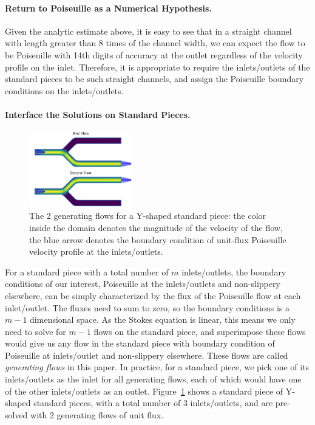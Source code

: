 \documentclass[10pt,twocolumn,letterpaper]{article}
\begin{document}
\paragraph{Return to Poiseuille as a Numerical Hypothesis.}
Given the analytic estimate above, 
it is easy to see that in a straight channel with length greater than 
8 times of the channel width, 
we can expect the flow to be Poiseuille with 14th digits of accuracy 
at the outlet regardless of the velocity profile on the inlet. 
Therefore, it is appropriate to require the inlets/outlets of 
the standard pieces to be such straight channels, 
and assign the Poiseuille boundary conditions on the inlets/outlets.



\paragraph{Interface the Solutions on Standard Pieces.}

\begin{figure}[!ht]
  \centering
  \includegraphics[width=0.4\textwidth]{pic/standard_pipe_flows_demo.png}
  \caption{The 2 generating flows for a Y-shaped standard piece: 
  the color inside the domain denotes the magnitude of the velocity of the flow, 
  the blue arrow denotes the boundary condition of unit-flux Poiseuille velocity profile at the inlets/outlets.}\label{fig:y_2_flows}
\end{figure}

For a standard piece with a total number of $m$ inlets/outlets, 
the boundary conditions of our interest, 
Poiseuille at the inlets/outlets and non-slippery elsewhere, 
can be simply characterized by the flux of the Poiseuille flow at each inlet/outlet. 
The fluxes need to sum to zero, so the boundary conditions is a $m-1$ dimensional space. 
As the Stokes equation is linear, 
this means we only need to solve for $m-1$ flows on the standard piece, 
and superimpose these flows would give us any flow in the standard piece 
with boundary condition of Poiseuille at inlets/outlet and non-slippery elsewhere. 
These flows are called \textit{generating flows} in this paper. 
In practice, for a standard piece, 
we pick one of its inlets/outlets as the inlet for all generating flows, 
each of which would have one of the other inlets/outlets as an outlet. 
Figure~\ref{fig:y_2_flows} shows a standard piece of Y-shaped standard pieces, 
with a total number of 3 inlets/outlets, 
and are pre-solved with 2 generating flows of unit flux. 
\end{document}
